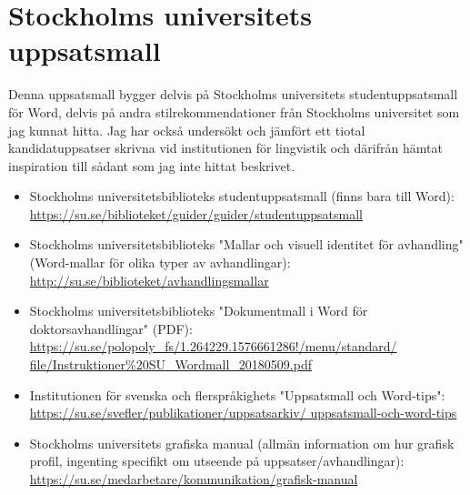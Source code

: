 
\section{Stockholms universitets uppsatsmall}
\label{utseende}

Denna uppsatsmall bygger delvis på Stockholms universitets studentuppsatsmall
för Word, delvis på andra stilrekommendationer från Stockholms universitet som
jag kunnat hitta. Jag har också undersökt och jämfört ett tiotal
kandidatuppsatser skrivna vid institutionen för lingvistik och därifrån hämtat
inspiration till sådant som jag inte hittat beskrivet.

\medskip

\begin{itemize}
\raggedright
\item Stockholms universitetsbiblioteks studentuppsatsmall (finns bara till
  Word):\\
  \url{https://su.se/biblioteket/guider/guider/studentuppsatsmall}

\item Stockholms universitetsbiblioteks "Mallar och visuell identitet för
  avhandling" \\
  (Word-mallar för olika typer av avhandlingar): \\
  \url{http://su.se/biblioteket/avhandlingsmallar}

\item Stockholms universitetsbiblioteks "Dokumentmall i Word för
  doktorsavhandlingar" (PDF): \\
  \url{https://su.se/polopoly\_fs/1.264229.1576661286!/menu/standard/
    file/Instruktioner%

\item Institutionen för svenska och flerspråkighets "Uppsatsmall och
  Word-tips": \\
  \url{https://su.se/svefler/publikationer/uppsatsarkiv/
    uppsatsmall-och-word-tips}

\item Stockholms universitets grafiska manual (allmän information om hur
  grafisk profil, ingenting specifikt om utseende på uppsatser/avhandlingar):
  \\
  \url{https://su.se/medarbetare/kommunikation/grafisk-manual}
\end{itemize}


